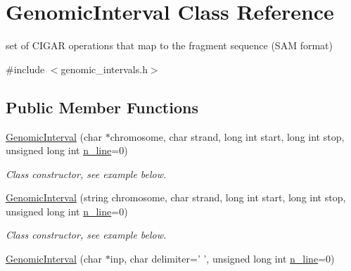 \hypertarget{classGenomicInterval}{
\section{GenomicInterval Class Reference}
\label{classGenomicInterval}
}


set of CIGAR operations that map to the fragment sequence (SAM format)  




{\ttfamily \#include $<$genomic\_\-intervals.h$>$}

\subsection*{Public Member Functions}
\begin{DoxyCompactItemize}
\item 
\hypertarget{classGenomicInterval_a09dcaee742ca117a8caaa1c656d0e354}{
\hyperlink{classGenomicInterval_a09dcaee742ca117a8caaa1c656d0e354}{GenomicInterval} (char $\ast$chromosome, char strand, long int start, long int stop, unsigned long int \hyperlink{classGenomicInterval_a0dbe6195570468c386eea923e30c762c}{n\_\-line}=0)}
\label{classGenomicInterval_a09dcaee742ca117a8caaa1c656d0e354}

\begin{DoxyCompactList}\small\item\em Class constructor, see example below. \end{DoxyCompactList}\item 
\hypertarget{classGenomicInterval_ac452f2239b17bc72efe4eef12a261514}{
\hyperlink{classGenomicInterval_ac452f2239b17bc72efe4eef12a261514}{GenomicInterval} (string chromosome, char strand, long int start, long int stop, unsigned long int \hyperlink{classGenomicInterval_a0dbe6195570468c386eea923e30c762c}{n\_\-line}=0)}
\label{classGenomicInterval_ac452f2239b17bc72efe4eef12a261514}

\begin{DoxyCompactList}\small\item\em Class constructor, see example below. \end{DoxyCompactList}\item 
\hypertarget{classGenomicInterval_a99f413828468dca1eeb5cc806848d98e}{
\hyperlink{classGenomicInterval_a99f413828468dca1eeb5cc806848d98e}{GenomicInterval} (char $\ast$inp, char delimiter=' ', unsigned long int \hyperlink{classGenomicInterval_a0dbe6195570468c386eea923e30c762c}{n\_\-line}=0)}
\label{classGenomicInterval_a99f413828468dca1eeb5cc806848d98e}


\end{DoxyCompactItemize}
